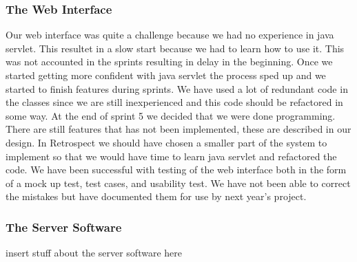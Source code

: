\subsubsection*{The Web Interface}
Our web interface was quite a challenge because we had no experience in java servlet. This resultet in a slow start because we had to learn how to use it. This was not accounted in the sprints resulting in delay in the beginning. Once we started getting more confident with java servlet the process sped up and we started to finish features during sprints.
We have used a lot of redundant code in the classes since we are still inexperienced and this code should be refactored in some way. At the end of sprint 5 we decided that we were done programming. There are still features that has not been implemented, these are described in our design.
In Retrospect we should have chosen a smaller part of the system to implement so that we would have time to learn java servlet and refactored the code. We have been successful with testing of the web interface both in the form of a mock up test, test cases, and usability test.
We have not been able to correct the mistakes but have documented them for use by next year's project.

\subsubsection*{The Server Software}

insert stuff about the server software here